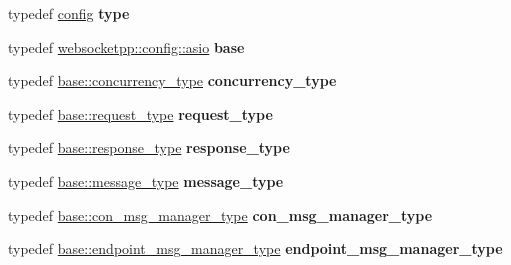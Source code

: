 \begin{DoxyCompactItemize}
\item 
typedef \hyperlink{classconfig}{config} {\bfseries type}\hypertarget{classconfig_ad4ebcddd1ad3164f8a4a31dbda329faa}{}\label{classconfig_ad4ebcddd1ad3164f8a4a31dbda329faa}

\item 
typedef \hyperlink{structwebsocketpp_1_1config_1_1asio}{websocketpp\+::config\+::asio} {\bfseries base}\hypertarget{classconfig_ae009ac61a0f75667d6f2ffd5bfe1e020}{}\label{classconfig_ae009ac61a0f75667d6f2ffd5bfe1e020}

\item 
typedef \hyperlink{classwebsocketpp_1_1concurrency_1_1basic}{base\+::concurrency\+\_\+type} {\bfseries concurrency\+\_\+type}\hypertarget{classconfig_aa53393e92725668936061e3b3a1f3894}{}\label{classconfig_aa53393e92725668936061e3b3a1f3894}

\item 
typedef \hyperlink{classwebsocketpp_1_1http_1_1parser_1_1request}{base\+::request\+\_\+type} {\bfseries request\+\_\+type}\hypertarget{classconfig_a94ed41ef4d54941205f17507519ff1ac}{}\label{classconfig_a94ed41ef4d54941205f17507519ff1ac}

\item 
typedef \hyperlink{classwebsocketpp_1_1http_1_1parser_1_1response}{base\+::response\+\_\+type} {\bfseries response\+\_\+type}\hypertarget{classconfig_ae993ff15fd839cf76c28fa958b9c4cd2}{}\label{classconfig_ae993ff15fd839cf76c28fa958b9c4cd2}

\item 
typedef \hyperlink{classwebsocketpp_1_1message__buffer_1_1message}{base\+::message\+\_\+type} {\bfseries message\+\_\+type}\hypertarget{classconfig_ac0d22fc7451d6f0e1c4e01827972ce25}{}\label{classconfig_ac0d22fc7451d6f0e1c4e01827972ce25}

\item 
typedef \hyperlink{classwebsocketpp_1_1message__buffer_1_1alloc_1_1con__msg__manager}{base\+::con\+\_\+msg\+\_\+manager\+\_\+type} {\bfseries con\+\_\+msg\+\_\+manager\+\_\+type}\hypertarget{classconfig_ae6b351ef7f04da59a76d6daa13582a75}{}\label{classconfig_ae6b351ef7f04da59a76d6daa13582a75}

\item 
typedef \hyperlink{classwebsocketpp_1_1message__buffer_1_1alloc_1_1endpoint__msg__manager}{base\+::endpoint\+\_\+msg\+\_\+manager\+\_\+type} {\bfseries endpoint\+\_\+msg\+\_\+manager\+\_\+type}\hypertarget{classconfig_a240db3b54e5e920262139446326b92d6}{}\label{classconfig_a240db3b54e5e920262139446326b92d6}


\end{DoxyCompactItemize}
